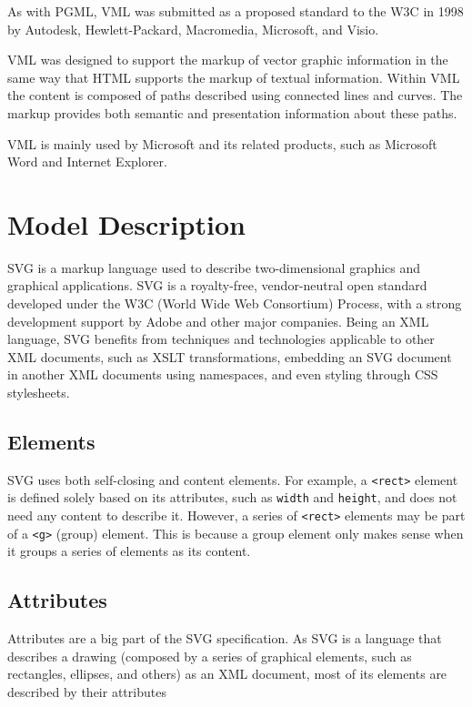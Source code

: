 \documentclass[twocolumn,twoside,10pt,a4paper]{article}
\begin{document}
As with PGML, VML was submitted as a proposed standard to the W3C in 1998 by Autodesk, Hewlett-Packard, Macromedia, Microsoft, and Visio.

VML was designed to support the markup of vector graphic information in the same way that HTML supports the markup of textual information. Within VML the content is composed of paths described using connected lines and curves. The markup provides both semantic and presentation information about these paths.

VML is mainly used by Microsoft and its related products, such as Microsoft Word and Internet Explorer.

\section{Model Description}

SVG is a markup language used to describe two-dimensional graphics and graphical applications. SVG is a royalty-free, vendor-neutral open standard developed under the W3C (World Wide Web Consortium) Process, with a strong development support by Adobe and other major companies.
Being an XML language, SVG benefits from techniques and technologies applicable to other XML documents, such as XSLT transformations, embedding an SVG document in another XML documents using namespaces, and even styling through CSS stylesheets.

\subsection{Elements}

SVG uses both self-closing and content elements. For example, a \verb!<rect>! element is defined solely based on its attributes, such as \verb!width! and \verb!height!, and does not need any content to describe it. However, a series of \verb!<rect>! elements may be part of a \verb!<g>! (group) element. This is because a group element only makes sense when it groups a series of elements as its content.


\subsection{Attributes}

Attributes are a big part of the SVG specification. As SVG is a language that describes a drawing (composed by a series of graphical elements, such as rectangles, ellipses, and others) as an XML document, most of its elements are described by their attributes
\end{document}
